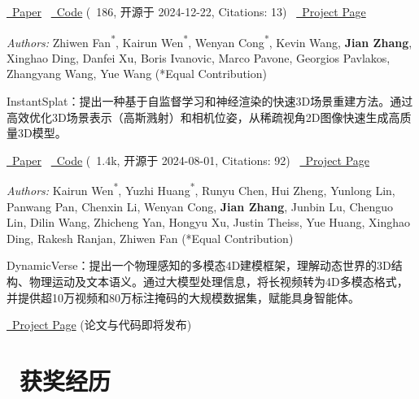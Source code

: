 \documentclass{resume}
\begin{document}
\href{https://arxiv.org/abs/2410.18956}{\faFileTextO\ Paper} \textperiodcentered\ \href{https://github.com/NVlabs/LSM}{\faCode\ Code} (\faStar\ 186, 开源于 2024-12-22, Citations: 13) \textperiodcentered\ \href{https://largespatialmodel.github.io/}{\faGlobe\ Project Page}

\textit{Authors:} Zhiwen Fan\textsuperscript{*}, Kairun Wen\textsuperscript{*}, Wenyan Cong\textsuperscript{*}, Kevin Wang, \textbf{Jian Zhang}, Xinghao Ding, Danfei Xu, Boris Ivanovic, Marco Pavone, Georgios Pavlakos, Zhangyang Wang, Yue Wang (*Equal Contribution)

InstantSplat：提出一种基于自监督学习和神经渲染的快速3D场景重建方法。通过高效优化3D场景表示（高斯溅射）和相机位姿，从稀疏视角2D图像快速生成高质量3D模型。

\href{https://arxiv.org/abs/2403.20309}{\faFileTextO\ Paper} \textperiodcentered\ \href{https://github.com/NVlabs/InstantSplat}{\faCode\ Code} (\faStar\ 1.4k, 开源于 2024-08-01, Citations: 92) \textperiodcentered\ \href{https://instantsplat.github.io/}{\faGlobe\ Project Page}

\textit{Authors:} Kairun Wen\textsuperscript{*}, Yuzhi Huang\textsuperscript{*}, Runyu Chen, Hui Zheng, Yunlong Lin, Panwang Pan, Chenxin Li, Wenyan Cong, \textbf{Jian Zhang}, Junbin Lu, Chenguo Lin, Dilin Wang, Zhicheng Yan, Hongyu Xu, Justin Theiss, Yue Huang, Xinghao Ding, Rakesh Ranjan, Zhiwen Fan (*Equal Contribution)

DynamicVerse：提出一个物理感知的多模态4D建模框架，理解动态世界的3D结构、物理运动及文本语义。通过大模型处理信息，将长视频转为4D多模态格式，并提供超10万视频和80万标注掩码的大规模数据集，赋能具身智能体。

\href{https://dynamic-verse.github.io/}{\faGlobe\ Project Page} (论文与代码即将发布)

\section{\faTrophy\  获奖经历}

%
%
\end{document}
